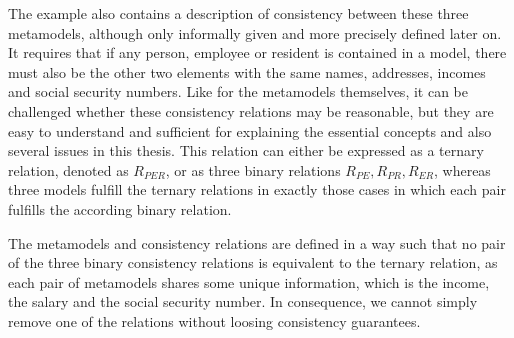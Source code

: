 The example also contains a description of consistency between these three metamodels, although only informally given and more precisely defined later on.
It requires that if any person, employee or resident is contained in a model, there must also be the other two elements with the same names, addresses, incomes and social security numbers.
Like for the metamodels themselves, it can be challenged whether these consistency relations may be reasonable, but they are easy to understand and sufficient for explaining the essential concepts and also several issues in this thesis.
This relation can either be expressed as a ternary relation, denoted as $R_{PER}$, or as three binary relations $R_{PE}, R_{PR}, R_{ER}$, whereas three models fulfill the ternary relations in exactly those cases in which each pair fulfills the according binary relation.

The metamodels and consistency relations are defined in a way such that no pair of the three binary consistency relations is equivalent to the ternary relation, as each pair of metamodels shares some unique information, which is the income, the salary and the social security number.
In consequence, we cannot simply remove one of the relations without loosing consistency guarantees.


    
